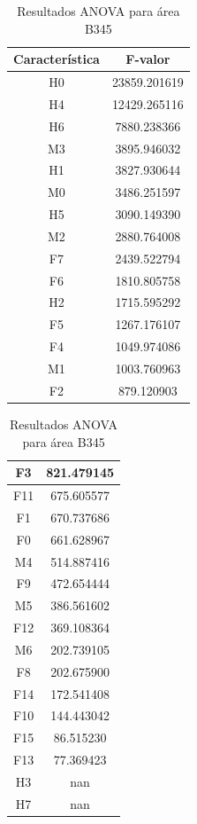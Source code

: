 \begin{table}[H]
	\centering
	\begin{tabular}{|c|c|}
		\hline
		Característica & F-valor \\ \hline
		H0 & 23859.201619 \\ \hline
		H4 & 12429.265116 \\ \hline
		H6 & 7880.238366 \\ \hline
		M3 & 3895.946032 \\ \hline
		H1 & 3827.930644 \\ \hline
		M0 & 3486.251597 \\ \hline
		H5 & 3090.149390 \\ \hline
		M2 & 2880.764008 \\ \hline
		F7 & 2439.522794 \\ \hline
		F6 & 1810.805758 \\ \hline
		H2 & 1715.595292 \\ \hline
		F5 & 1267.176107 \\ \hline
		F4 & 1049.974086 \\ \hline
		M1 & 1003.760963 \\ \hline
		F2 & 879.120903 \\ \hline
	\end{tabular}
	\begin{tabular}{|c|c|}
		\hline
		F3 & 821.479145 \\ \hline
		F11 & 675.605577 \\ \hline
		F1 & 670.737686 \\ \hline
		F0 & 661.628967 \\ \hline
		M4 & 514.887416 \\ \hline
		F9 & 472.654444 \\ \hline
		M5 & 386.561602 \\ \hline
		F12 & 369.108364 \\ \hline
		M6 & 202.739105 \\ \hline
		F8 & 202.675900 \\ \hline
		F14 & 172.541408 \\ \hline
		F10 & 144.443042 \\ \hline
		F15 & 86.515230 \\ \hline
		F13 & 77.369423 \\ \hline
		H3 & nan \\ \hline
		H7 & nan \\ \hline
	\end{tabular}	
	\caption{Resultados ANOVA para área B345}	
	\label{tab:anova_b345}
\end{table}

